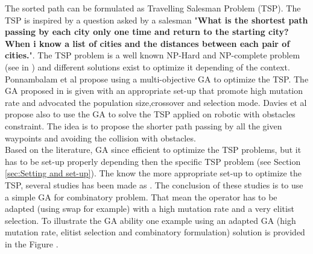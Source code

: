 The sorted path can be formulated as Travelling Salesman Problem (TSP). The TSP is inspired by a question asked by a salesman "\textbf{What is the shortest path passing by each city only one time and return to the starting city? When i know a list of cities and the distances between each pair of cities.}". The TSP problem is a well known NP-Hard and NP-complete problem (see in \citep{236*karp1972}) and different solutions exist to optimize it depending of the context. 
Ponnambalam et al  \cite{172*ponnambalam2004} propose using a multi-objective GA to optimize the TSP. 
The GA proposed in \cite{172*ponnambalam2004} is given with an appropriate set-up that promote high mutation rate and advocated the population size,crossover and selection mode. Davies et al \cite{56*davies2006} propose also to use the GA to solve the TSP applied on robotic with obstacles constraint. The idea is to propose the shorter path passing by all the given waypoints and avoiding the collision with obstacles.  \\
Based on the literature, GA since efficient to optimize the TSP problems, but it has to be set-up properly depending then the specific TSP problem (see Section \ref{sec:Setting and set-up}). 
The know the more appropriate set-up to optimize the TSP, several studies has been made as \citep{68*muhlenbein1989,80*serpell2010,139*razali2011}. The conclusion of these studies is to use a simple GA for combinatory problem. That mean the operator has to be adapted (using swap for example) with a high mutation rate and a very elitist selection.
To illustrate the GA ability one example using an adapted GA (high mutation rate,  elitist selection and combinatory formulation) solution is provided in the Figure .




